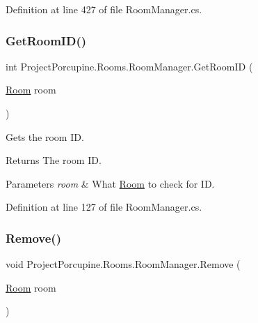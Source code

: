 Definition at line 427 of file Room\+Manager.\+cs.

\mbox{\label{class_project_porcupine_1_1_rooms_1_1_room_manager_a4d27ea1253a0af30d859d36334a63e6f}} 
\subsubsection{\texorpdfstring{Get\+Room\+I\+D()}{GetRoomID()}}
{\footnotesize\ttfamily int Project\+Porcupine.\+Rooms.\+Room\+Manager.\+Get\+Room\+ID (\begin{DoxyParamCaption}\item[{\hyperlink{class_project_porcupine_1_1_rooms_1_1_room}{Room}}]{room }\end{DoxyParamCaption})}



Gets the room ID. 

\begin{DoxyReturn}{Returns}
The room ID.
\end{DoxyReturn}

\begin{DoxyParams}{Parameters}
{\em room} & What \hyperlink{class_project_porcupine_1_1_rooms_1_1_room}{Room} to check for ID.\\
\hline
\end{DoxyParams}


Definition at line 127 of file Room\+Manager.\+cs.

\mbox{\label{class_project_porcupine_1_1_rooms_1_1_room_manager_a80086ec355ff9c1489858d76358fba8b}} 
\subsubsection{\texorpdfstring{Remove()}{Remove()}}
{\footnotesize\ttfamily void Project\+Porcupine.\+Rooms.\+Room\+Manager.\+Remove (\begin{DoxyParamCaption}\item[{\hyperlink{class_project_porcupine_1_1_rooms_1_1_room}{Room}}]{room }\end{DoxyParamCaption})}



